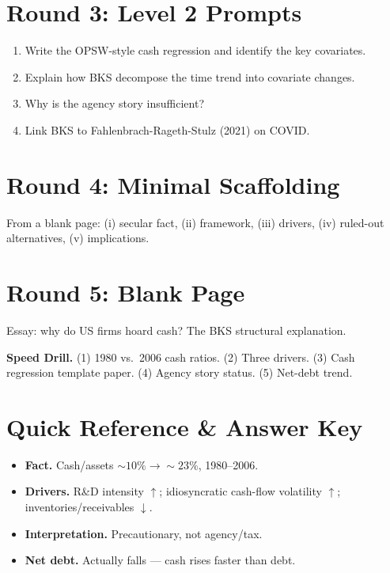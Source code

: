 \documentclass[11pt]{article}
\begin{document}
\section*{Round 3: Level 2 Prompts}
\begin{enumerate}
\item Write the OPSW-style cash regression and identify the key covariates.
\item Explain how BKS decompose the time trend into covariate changes.
\item Why is the agency story insufficient?
\item Link BKS to Fahlenbrach-Rageth-Stulz (2021) on COVID.
\end{enumerate}

\section*{Round 4: Minimal Scaffolding}
From a blank page: (i) secular fact, (ii) framework, (iii) drivers, (iv) ruled-out alternatives, (v) implications.

\section*{Round 5: Blank Page}
Essay: why do US firms hoard cash? The BKS structural explanation.

\vspace{6pt}
\begin{drillbox}
\textbf{Speed Drill.} (1) 1980 vs.\ 2006 cash ratios. (2) Three drivers. (3) Cash regression template paper. (4) Agency story status. (5) Net-debt trend.
\end{drillbox}

\section*{Quick Reference \& Answer Key}
\begin{answerbox}
\begin{itemize}
\item \textbf{Fact.} Cash/assets $\sim 10\%\to\sim 23\%$, 1980--2006.
\item \textbf{Drivers.} R\&D intensity $\uparrow$; idiosyncratic cash-flow volatility $\uparrow$; inventories/receivables $\downarrow$.
\item \textbf{Interpretation.} Precautionary, not agency/tax.
\item \textbf{Net debt.} Actually falls --- cash rises faster than debt.
\end{itemize}
\end{answerbox}
\end{document}
